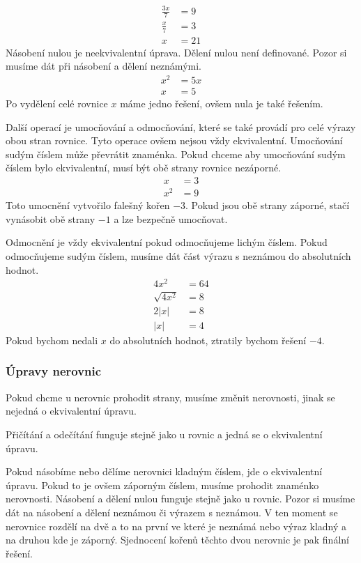 \documentclass[12pt]{article}
\begin{document}
\[
\begin{aligned}
    \frac{3x}{7} &= 9 \\
    \frac{x}{7} &= 3 \\
    x &= 21
\end{aligned}
\]
Násobení nulou je neekvivalentní úprava. Dělení nulou není definované. Pozor si musíme dát při
násobení a dělení neznámými.
\[
\begin{aligned}
    x^2 &= 5x \\
    x &= 5
\end{aligned}
\]
Po vydělení celé rovnice $x$ máme jedno řešení, ovšem nula je také řešením.

Další operací je umocňování a odmocňování, které se také provádí pro celé výrazy obou stran rovnice.
Tyto operace ovšem nejsou vždy ekvivalentní. Umocňování sudým číslem může převrátit znaménka. Pokud
chceme aby umocňování sudým číslem bylo ekvivalentní, musí být obě strany rovnice nezáporné.
\[
\begin{aligned}
    x &= 3 \\
    x^2 &= 9
\end{aligned}
\]
Toto umocnění vytvořilo falešný kořen $-3$. Pokud jsou obě strany záporné, stačí vynásobit obě strany
$-1$ a lze bezpečně umocňovat.

Odmocnění je vždy ekvivalentní pokud odmocňujeme lichým číslem. Pokud odmocňujeme sudým číslem,
musíme dát část výrazu s neznámou do absolutních hodnot.
\[
\begin{aligned}
    4x^2 &= 64 \\
    \sqrt{4x^2} &= 8 \\
    2|x| &= 8 \\
    |x| &= 4
\end{aligned}
\]
Pokud bychom nedali $x$ do absolutních hodnot, ztratily bychom řešení $-4$.
\subsubsection*{Úpravy nerovnic}
Pokud chcme u nerovnic prohodit strany, musíme změnit nerovnosti, jinak se nejedná
o ekvivalentní úpravu.

Přičítání a odečítání funguje stejně jako u rovnic a jedná se o ekvivalentní úpravu.

Pokud násobíme nebo dělíme nerovnici kladným číslem, jde o ekvivalentní úpravu. Pokud to je ovšem
záporným číslem, musíme prohodit znaménko nerovnosti. Násobení a dělení nulou funguje stejně jako
u rovnic. Pozor si musíme dát na násobení a dělení neznámou či výrazem s neznámou. V ten moment
se nerovnice rozdělí na dvě a to na první ve které je neznámá nebo výraz kladný a na druhou kde
je záporný. Sjednocení kořenů těchto dvou nerovnic je pak finální řešení.
\end{document}
